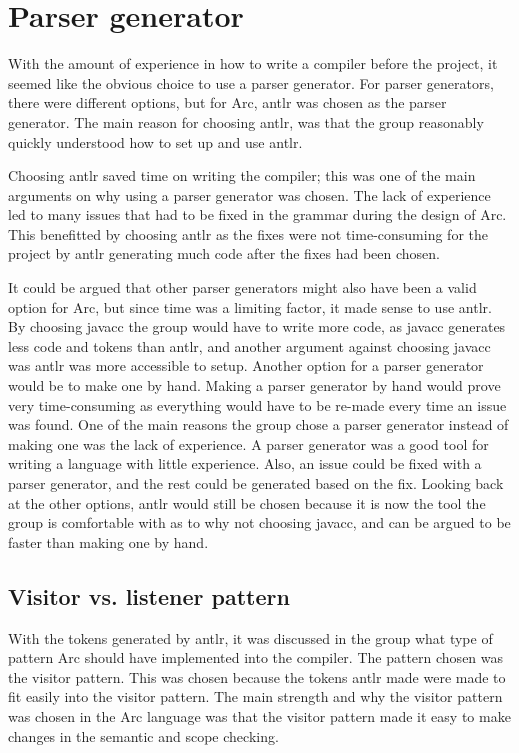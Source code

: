 \section{Parser generator}\label{sec:discussion_parserGenerator}

With the amount of experience in how to write a compiler before the project, it seemed like the obvious choice to use a parser generator. For parser generators, there were different options, but for Arc, \gls{antlr} was chosen as the parser generator. The main reason for choosing \gls{antlr}, was that the group reasonably quickly understood how to set up and use \gls{antlr}. 


Choosing \gls{antlr} saved time on writing the compiler; this was one of the main arguments on why using a parser generator was chosen. The lack of experience led to many issues that had to be fixed in the grammar during the design of Arc. This benefitted by choosing \gls{antlr} as the fixes were not time-consuming for the project by \gls{antlr} generating much code after the fixes had been chosen. 


It could be argued that other parser generators might also have been a valid option for Arc, but since time was a limiting factor, it made sense to use \gls{antlr}. By choosing \gls{javacc} the group would have to write more code, as \gls{javacc} generates less code and tokens than \gls{antlr}, and another argument against choosing \gls{javacc} was \gls{antlr} was more accessible to setup. Another option for a parser generator would be to make one by hand. Making a parser generator by hand would prove very time-consuming as everything would have to be re-made every time an issue was found. One of the main reasons the group chose a parser generator instead of making one was the lack of experience. A parser generator was a good tool for writing a language with little experience. Also, an issue could be fixed with a parser generator, and the rest could be generated based on the fix. Looking back at the other options, \gls{antlr} would still be chosen because it is now the tool the group is comfortable with as to why not choosing \gls{javacc}, and can be argued to be faster than making one by hand.

\subsection{Visitor vs. listener pattern}

With the tokens generated by \gls{antlr}, it was discussed in the group what type of pattern Arc should have implemented into the compiler. The pattern chosen was the visitor pattern. This was chosen because the tokens \gls{antlr} made were made to fit easily into the visitor pattern.
The main strength and why the visitor pattern was chosen in the Arc language was that the visitor pattern made it easy to make changes in the semantic and scope checking. 

